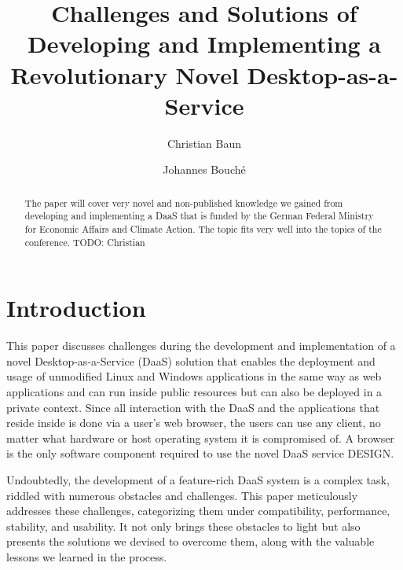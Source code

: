 \documentclass[runningheads]{llncs}
\begin{document}
%
\title{Challenges and Solutions of Developing and
	Implementing a Revolutionary Novel Desktop-as-a-Service}
%
%
\author{Christian Baun \and 
Johannes Bouché}
%
%
%
\maketitle              %
%
\begin{abstract}
	The paper will cover very novel and non-published knowledge we gained
	from developing and implementing a DaaS that is funded by the German
	Federal Ministry for Economic Affairs and Climate Action. The topic
	fits very well into the topics of the conference. TODO: Christian

\end{abstract}
%
%
%
\section{Introduction}


This paper discusses challenges during the development and implementation of a novel Desktop-as-a-Service (DaaS) solution that enables the deployment and usage of unmodified Linux and Windows applications in the same way as web applications and can run inside public resources but can also be deployed in a private context. Since all interaction with the DaaS and the applications that reside inside is done via a user's web browser, the users can use any client, no matter what hardware or host operating system it is compromised of. A browser is the only software component required to use the novel DaaS service DESIGN.

Undoubtedly, the development of a feature-rich DaaS system is a complex task, riddled with numerous obstacles and challenges. This paper meticulously addresses these challenges, categorizing them under compatibility, performance, stability, and usability. It not only brings these obstacles to light but also presents the solutions we devised to overcome them, along with the valuable lessons we learned in the process.
\end{document}

